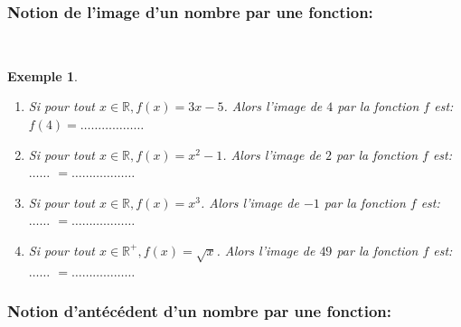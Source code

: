 \documentclass[a4paper,10.5pt]{article}
\newtheorem{defi}{Définition}
\newtheorem{ex}{Exemple}
\newcommand{\R}{\mathbb{R}}
\begin{document}
\subsubsection{Notion de l'image d'un nombre par une fonction:}
\noindent{}\hfill\\

\begin{ex}\hfil\\[-0.6cm]
\begin{enumerate}
\item Si pour tout  $x\in\R , f(x)= 3x-5 $. Alors l'image de $4$ par la fonction $f$ est:  $f(4)= \dots\dots \dots\dots\dots \dots$
\item Si pour tout  $x\in\R , f(x)= x^2-1 $. Alors l'image de $2$ par la fonction $f$ est:  $\dots\dots$   $= \dots\dots \dots\dots\dots \dots$
\item Si pour tout  $x\in\R , f(x)= x^3 $. Alors l'image de $-1$ par la fonction $f$ est:  $\dots\dots$   $= \dots\dots \dots\dots\dots \dots$
\item Si pour tout  $x\in\R^+ , f(x)= \sqrt{x} $. Alors l'image de $49$ par la fonction $f$ est:  $\dots\dots$   $= \dots\dots \dots\dots\dots \dots$
\end{enumerate}
\end{ex}
\subsubsection{Notion d'antécédent d'un nombre par une fonction:}
\end{document}
